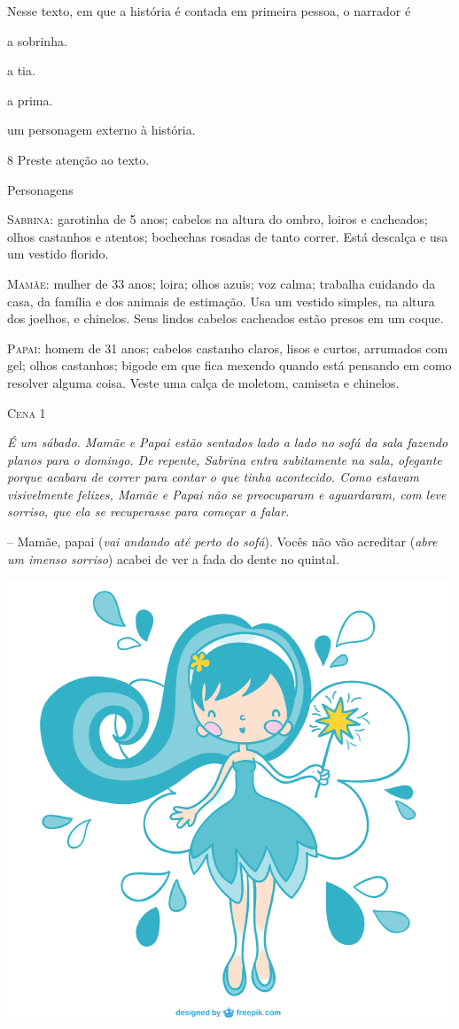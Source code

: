 Nesse texto, em que a história é contada em primeira pessoa, o narrador
é

\begin{escolha}
\item a sobrinha.

\item a tia.

\item a prima.

\item um personagem externo à história.
\end{escolha}


\num{8} Preste atenção ao texto.

\begin{myquote}
Personagens

\textsc{Sabrina}: garotinha de 5 anos; cabelos na altura do ombro, loiros
e cacheados; olhos castanhos e atentos; bochechas rosadas de tanto
correr. Está descalça e usa um vestido florido.

\textsc{Mamãe}: mulher de 33 anos; loira; olhos azuis; voz calma; trabalha
cuidando da casa, da família e dos animais de estimação. Usa um vestido
simples, na altura dos joelhos, e chinelos. Seus lindos cabelos
cacheados estão presos em um coque.

\textsc{Papai}: homem de 31 anos; cabelos castanho claros, lisos e curtos,
arrumados com gel; olhos castanhos; bigode em que fica mexendo quando
está pensando em como resolver alguma coisa. Veste uma calça de moletom,
camiseta e chinelos.

\textsc{Cena 1}

\textit{É um sábado. Mamãe e Papai estão sentados lado a lado no sofá da sala
fazendo planos para o domingo. De repente, Sabrina entra subitamente na
sala, ofegante porque acabara de correr para contar o que tinha
acontecido. Como estavam visivelmente felizes, Mamãe e Papai não se
preocuparam e aguardaram, com leve sorriso, que ela se recuperasse para
começar a falar.}

-- Mamãe, papai (\textit{vai andando até perto do sofá}). Vocês não vão acreditar
(\textit{abre um imenso sorriso}) acabei de ver a fada do dente no quintal.

\begin{center}
\includegraphics[width=.5\textwidth]{./media/image23u.png}
\end{center}


\end{myquote}
